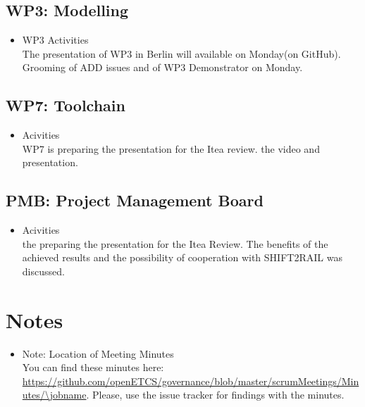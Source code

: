 \documentclass[a4paper, 11pt]{article}
\begin{document}
\subsection{WP3: Modelling}


\begin{itemize}
\item WP3 Activities\\
The presentation of WP3 in Berlin will available on Monday(on GitHub).
Grooming of ADD issues and of WP3 Demonstrator on Monday.


\end{itemize}

\subsection{WP7: Toolchain}

\begin{itemize}
\item Acivities\\

WP7 is preparing the presentation for the Itea review.
the video and presentation.

\end{itemize}

\subsection{PMB: Project Management Board}
\begin{itemize}
\item Acivities\\

 the preparing the presentation for the Itea Review.
 The benefits of the achieved results and the possibility of cooperation with SHIFT2RAIL was discussed.
\end{itemize}
\section{Notes}
\begin{itemize}

\item Note: Location of Meeting Minutes\\
You can find these minutes here: \url{https://github.com/openETCS/governance/blob/master/scrumMeetings/Minutes/\jobname}. Please, use the issue tracker for findings with the minutes.

\end{itemize}
\end{document}
